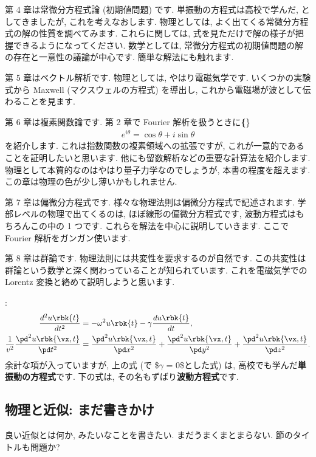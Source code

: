 \documentclass[openany, a4paper, oneside]{jsbook}
\begin{document}
{第 4 章は常微分方程式論 (初期値問題) です.
単振動の方程式は高校で学んだ, としてきましたが, これを考えなおします.
物理としては, よく出てくる常微分方程式の解の性質を調べてみます.
これらに関しては, 式を見ただけで解の様子が把握できるようになってください.
数学としては, 常微分方程式の初期値問題の解の存在と一意性の議論が中心です.
簡単な解法にも触れます.

第 5 章はベクトル解析です.
物理としては, やはり電磁気学です.
いくつかの実験式から Maxwell (マクスウェルの方程式) を導出し,
これから電磁場が波として伝わることを見ます.

第 6 章は複素関数論です.
第 2 章で Fourier 解析を扱うときに\textbf\{\}
\begin{align}
    e^{i \theta}
    =
    \cos \theta + i \sin \theta
\end{align}
を紹介します.
これは指数関数の複素領域への拡張ですが, これが一意的であることを証明したいと思います.
他にも留数解析などの重要な計算法を紹介します.
物理として本質的なのはやはり量子力学なのでしょうが, 本書の程度を超えます.
この章は物理の色が少し薄いかもしれません.

第 7 章は偏微分方程式です.
様々な物理法則は偏微分方程式で記述されます.
学部レベルの物理で出てくるのは, ほぼ線形の偏微分方程式です,
波動方程式はもちろんこの中の 1 つです.
これらを解法を中心に説明していきます.
ここで Fourier 解析をガンガン使います.

第 8 章は群論です.
物理法則には共変性を要求するのが自然です.
この共変性は群論という数学と深く関わっていることが知られています.
これを電磁気学での Lorentz 変換と絡めて説明しようと思います.}:
\begin{align}
 \frac{d^2 u \rbk{t} }{d t^2}
 &=
 -\omega^2 u \rbk{t} - \gamma \frac{d u \rbk{t}}{dt} , \\
 \frac{1}{v^2} \frac{\pd^2 u \rbk{ \vx , t }}{\pd t^2}
 &=
 \frac{\pd^2 u \rbk{\vx , t}}{\pd x^2} + \frac{\pd^2 u \rbk{\vx , t}}{\pd y^2} + \frac{\pd^2 u \rbk{\vx , t}}{\pd z^2}.
\end{align}
余計な項が入っていますが, 上の式 (で \$$\gamma$ = 0\$とした式) は,
高校でも学んだ\textbf{単振動の方程式}です.
下の式は, その名もずばり\textbf{波動方程式}です.
\subsection{物理と近似: まだ書きかけ}

良い近似とは何か, みたいなことを書きたい.
まだうまくまとまらない.
節のタイトルも問題か?
\end{document}
